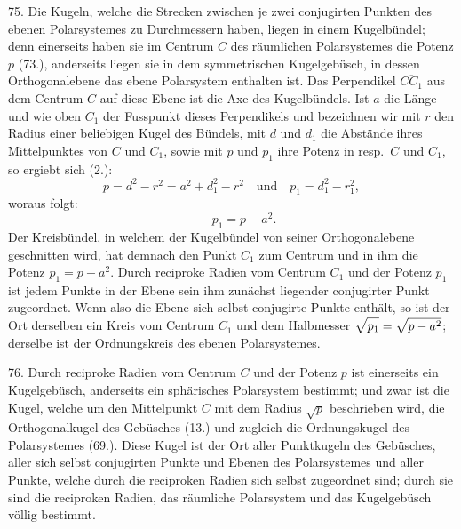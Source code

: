 75. Die Kugeln, welche die Strecken zwischen je zwei
conjugirten Punkten des ebenen Polarsystemes zu Durchmessern
haben, liegen in einem Kugelb\"undel; denn einerseits
haben sie im Centrum $C$ des r\"aumlichen Polarsystemes die
Potenz $p$ (73.), anderseits liegen sie in dem symmetrischen
Kugelgeb\"usch, in dessen Orthogonalebene das ebene Polarsystem
enthalten ist. Das Perpendikel $\overline{CC_1}$ aus dem Centrum
$C$ auf diese Ebene ist die Axe des Kugelb\"undels. Ist
$a$ die L\"ange und wie oben $C_1$ der Fusspunkt dieses Perpendikels
und bezeichnen wir mit $r$ den Radius einer beliebigen
Kugel des B\"undels, mit $d$ und $d_1$ die Abst\"ande ihres Mittelpunktes
von $C$ und $C_1$, sowie mit $p$ und $p_1$ ihre Potenz in
resp.\ $C$ und $C_1$, so ergiebt sich (2.):
\[
p = d^2 - r^2 = a^2 + d_1^2 - r^2 \quad\text{und}\quad p_1 = d_1^2 - r_1^2,
\]
woraus folgt:
\[
\quad\quad p_1 = p - a^2.
\]
Der Kreisb\"undel, in welchem der Kugelb\"undel von seiner
Orthogonalebene geschnitten wird, hat demnach den Punkt
$C_1$ zum Centrum und in ihm die Potenz $p_1 = p - a^2$. Durch
reciproke Radien vom Centrum $C_1$ und der Potenz $p_1$ ist
jedem Punkte in der Ebene sein ihm zun\"achst liegender conjugirter
Punkt zugeordnet. Wenn also die Ebene sich selbst
conjugirte Punkte enth\"alt, so ist der Ort derselben ein Kreis
vom Centrum $C_1$ und dem Halbmesser $\sqrt{p_1\vphantom{a^2}} = \sqrt{p-a^2}$; derselbe
ist der Ordnungskreis des ebenen Polarsystemes.

\begin{center}
\makebox[15em]{\hrulefill}
\end{center}

\label{p8}


\hspace{\parindent}%
76. Durch reciproke Radien vom Centrum $C$ und der
Potenz $p$ ist einerseits ein Kugelgeb\"usch, anderseits ein
sph\"arisches Polarsystem bestimmt; und zwar ist die Kugel,
welche um den Mittelpunkt $C$ mit dem Radius $\sqrt{p}$ beschrieben
wird, die Orthogonalkugel des Geb\"usches (13.) und zugleich
die Ordnungskugel des Polarsystemes (69.). Diese
Kugel ist der Ort aller Punktkugeln des Geb\"usches, aller
sich selbst conjugirten Punkte und Ebenen des Polarsystemes
und aller Punkte, welche durch die reciproken Radien sich
selbst zugeordnet sind; durch sie sind die reciproken Radien,
das r\"aumliche Polarsystem und das Kugelgeb\"usch v\"ollig
bestimmt.

